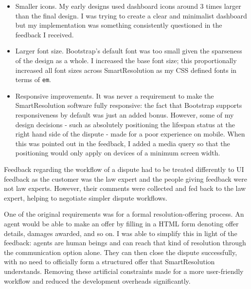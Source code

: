 \begin{itemize}
\item Smaller icons. My early designs used dashboard icons around 3 times larger than the final design. I was trying to create a clear and minimalist dashboard but my implementation was something consistently questioned in the feedback I received.
\item Larger font size. Bootstrap's default font was too small given the sparseness of the design as a whole. I increased the base font size; this proportionally increased all font sizes across SmartResolution as my CSS defined fonts in terms of \lstinline{em}.
\item Responsive improvements. It was never a requirement to make the SmartResolution software fully responsive: the fact that Bootstrap supports responsiveness by default was just an added bonus. However, some of my design decisions - such as absolutely positioning the lifespan status at the right hand side of the dispute - made for a poor experience on mobile. When this was pointed out in the feedback, I added a media query so that the positioning would only apply on devices of a minimum screen width.
\end{itemize}

Feedback regarding the workflow of a dispute had to be treated differently to UI feedback as the customer was the law expert and the people giving feedback were not law experts. However, their comments were collected and fed back to the law expert, helping to negotiate simpler dispute workflows.

One of the original requirements was for a formal resolution-offering process. An agent would be able to make an offer by filling in a HTML form denoting offer details, damages awarded, and so on. I was able to simplify this in light of the feedback: agents are human beings and can reach that kind of resolution through the communication option alone. They can then close the dispute successfully, with no need to officially form a structured offer that SmartResolution understands. Removing these artificial constraints made for a more user-friendly workflow and reduced the development overheads significantly.